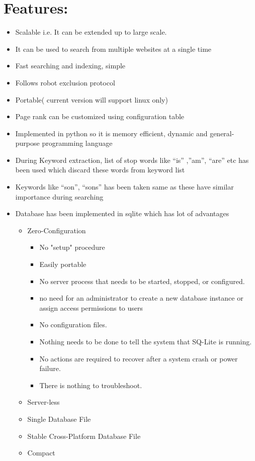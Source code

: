 \documentclass{scrreprt}
\begin{document}
\section{Features:}
\begin{itemize}
    \item Scalable i.e. It can be extended up to large scale.
    \item It can be used to search from multiple websites at a single time
    \item Fast searching and indexing, simple
    \item Follows robot exclusion protocol
    \item Portable( current version will support linux only)
    \item Page rank can be customized using configuration table
    \item Implemented in python so it is memory efficient, dynamic and general-purpose programming language
    \item During Keyword extraction, list of stop words like “is” ,”am”, “are” etc has been used which discard these words from keyword list
    \item Keywords like “son”, “sons” has been taken same as these have similar importance during searching
    
    
    \item Database has been implemented in sqlite which has lot of advantages
    \begin{itemize}
      \item Zero-Configuration
      \begin{itemize}
        \item No "setup" procedure
        \item Easily portable
        \item No server process that needs to be started, stopped, or configured.
        \item no need for an administrator to create a new database instance or assign access permissions to users
        \item No configuration files. 
        \item Nothing needs to be done to tell the system that SQ-Lite is running. 
        \item No actions are required to recover after a system crash or power failure. 
        \item There is nothing to troubleshoot.

      \end{itemize}
     \item Server-less
     \item Single Database File
    \item Stable Cross-Platform Database File
    \item Compact


    \end{itemize}
    
\end{itemize}
    
\end{document}
